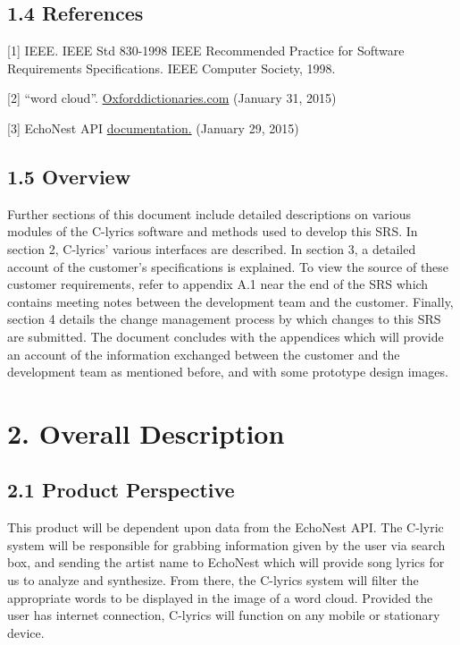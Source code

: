 \documentclass[]{article}
\begin{document}
\subsection{1.4 References}\label{references}

{[}1{]} IEEE. IEEE Std 830-1998 IEEE Recommended Practice for Software
Requirements Specifications. IEEE Computer Society, 1998.

{[}2{]} ``word cloud''.
\href{http://www.oxforddictionaries.com/us/definition/american_english/word-cloud}{Oxforddictionaries.com}
(January 31, 2015)

{[}3{]} EchoNest API
\href{http://developer.echonest.com/docs/v4/index.html\#overview}{documentation.}
(January 29, 2015)

\subsection{1.5 Overview}\label{overview}

Further sections of this document include detailed descriptions on
various modules of the C-lyrics software and methods used to develop
this SRS. In section 2, C-lyrics' various interfaces are described. In
section 3, a detailed account of the customer's specifications is
explained. To view the source of these customer requirements, refer to
appendix A.1 near the end of the SRS which contains meeting notes
between the development team and the customer. Finally, section 4
details the change management process by which changes to this SRS are
submitted. The document concludes with the appendices which will provide
an account of the information exchanged between the customer and the
development team as mentioned before, and with some prototype design
images.

\section{2. Overall Description}\label{overall-description}

\subsection{2.1 Product Perspective}\label{product-perspective}

This product will be dependent upon data from the EchoNest API. The
C-lyric system will be responsible for grabbing information given by the
user via search box, and sending the artist name to EchoNest which will
provide song lyrics for us to analyze and synthesize. From there, the
C-lyrics system will filter the appropriate words to be displayed in the
image of a word cloud. Provided the user has internet connection,
C-lyrics will function on any mobile or stationary device.
\end{document}
